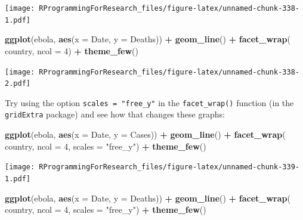 \documentclass[]{book}
\makeatletter
\newenvironment{Shaded}{\begin{snugshade}}{\end{snugshade}}
\newcommand{\KeywordTok}[1]{\textcolor[rgb]{0.13,0.29,0.53}{\textbf{#1}}}
\newcommand{\DataTypeTok}[1]{\textcolor[rgb]{0.13,0.29,0.53}{#1}}
\newcommand{\DecValTok}[1]{\textcolor[rgb]{0.00,0.00,0.81}{#1}}
\newcommand{\StringTok}[1]{\textcolor[rgb]{0.31,0.60,0.02}{#1}}
\newcommand{\OperatorTok}[1]{\textcolor[rgb]{0.81,0.36,0.00}{\textbf{#1}}}
\newcommand{\NormalTok}[1]{#1}
\newenvironment{kframe}{%
\medskip{}
\setlength{\fboxsep}{.8em}
 \def\at@end@of@kframe{}%
 \ifinner\ifhmode%
  \def\at@end@of@kframe{\end{minipage}}%
  \begin{minipage}{\columnwidth}%
 \fi\fi%
 \def\FrameCommand##1{\hskip\@totalleftmargin \hskip-\fboxsep
 \colorbox{shadecolor}{##1}\hskip-\fboxsep
     \hskip-\linewidth \hskip-\@totalleftmargin \hskip\columnwidth}%
 \MakeFramed {\advance\hsize-\width
   \@totalleftmargin\z@ \linewidth\hsize
   \@setminipage}}%
 {\par\unskip\endMakeFramed%
 \at@end@of@kframe}
\renewenvironment{Shaded}{\begin{kframe}}{\end{kframe}}
\theoremstyle{definition}
\theoremstyle{definition}
\theoremstyle{definition}
\theoremstyle{remark}
\makeatother
\begin{document}
\texttt{[image: RProgrammingForResearch\_files/figure-latex/unnamed-chunk-338-1.pdf]}

\begin{Shaded}
\begin{Highlighting}[]
\KeywordTok{ggplot}\NormalTok{(ebola, }\KeywordTok{aes}\NormalTok{(}\DataTypeTok{x =}\NormalTok{ Date, }\DataTypeTok{y =}\NormalTok{ Deaths)) }\OperatorTok{+}\StringTok{ }
\StringTok{        }\KeywordTok{geom_line}\NormalTok{() }\OperatorTok{+}\StringTok{ }
\StringTok{        }\KeywordTok{facet_wrap}\NormalTok{(}\OperatorTok{~}\StringTok{ }\NormalTok{country, }\DataTypeTok{ncol =} \DecValTok{4}\NormalTok{) }\OperatorTok{+}\StringTok{ }
\StringTok{        }\KeywordTok{theme_few}\NormalTok{()}
\end{Highlighting}
\end{Shaded}

\texttt{[image: RProgrammingForResearch\_files/figure-latex/unnamed-chunk-338-2.pdf]}

Try using the option \texttt{scales\ =\ "free\_y"} in the
\texttt{facet\_wrap()} function (in the \texttt{gridExtra} package) and
see how that changes these graphs:

\begin{Shaded}
\begin{Highlighting}[]
\KeywordTok{ggplot}\NormalTok{(ebola, }\KeywordTok{aes}\NormalTok{(}\DataTypeTok{x =}\NormalTok{ Date, }\DataTypeTok{y =}\NormalTok{ Cases)) }\OperatorTok{+}\StringTok{ }
\StringTok{        }\KeywordTok{geom_line}\NormalTok{() }\OperatorTok{+}\StringTok{ }
\StringTok{        }\KeywordTok{facet_wrap}\NormalTok{(}\OperatorTok{~}\StringTok{ }\NormalTok{country, }\DataTypeTok{ncol =} \DecValTok{4}\NormalTok{, }\DataTypeTok{scales =} \StringTok{"free_y"}\NormalTok{) }\OperatorTok{+}\StringTok{ }
\StringTok{        }\KeywordTok{theme_few}\NormalTok{()}
\end{Highlighting}
\end{Shaded}

\texttt{[image: RProgrammingForResearch\_files/figure-latex/unnamed-chunk-339-1.pdf]}

\begin{Shaded}
\begin{Highlighting}[]
\KeywordTok{ggplot}\NormalTok{(ebola, }\KeywordTok{aes}\NormalTok{(}\DataTypeTok{x =}\NormalTok{ Date, }\DataTypeTok{y =}\NormalTok{ Deaths)) }\OperatorTok{+}\StringTok{ }
\StringTok{        }\KeywordTok{geom_line}\NormalTok{() }\OperatorTok{+}\StringTok{ }
\StringTok{        }\KeywordTok{facet_wrap}\NormalTok{(}\OperatorTok{~}\StringTok{ }\NormalTok{country, }\DataTypeTok{ncol =} \DecValTok{4}\NormalTok{, }\DataTypeTok{scales =} \StringTok{"free_y"}\NormalTok{) }\OperatorTok{+}\StringTok{ }
\StringTok{        }\KeywordTok{theme_few}\NormalTok{()}
\end{Highlighting}
\end{Shaded}
\end{document}
